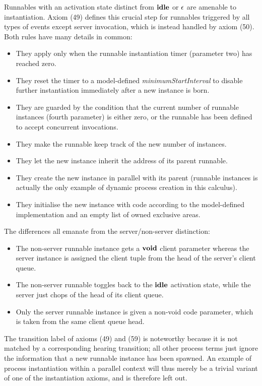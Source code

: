 \documentclass[twocolumn]{article}
\begin{document}
Runnables with an activation state distinct from $\textbf{idle}$ or $\epsilon$ are amenable to instantiation. Axiom (49) defines this crucial step for runnables triggered by all types of events except server invocation, which is instead handled by axiom (50). Both rules have many details in common:
\begin{itemize}
\item They apply only when the runnable instantiation timer (parameter two) has reached zero.
\item They reset the timer to a model-defined \emph{minimumStartInterval} to disable further instantiation immediately after a new instance is born.
\item They are guarded by the condition that the current number of runnable instances (fourth parameter) is either zero, or the runnable has been defined to accept concurrent invocations.
\item They make the runnable keep track of the new number of instances.
\item They let the new instance inherit the address of its parent runnable.
\item They create the new instance in parallel with its parent (runnable instances is actually the only example of dynamic process creation in this calculus).
\item They initialise the new instance with code according to the model-defined implementation and an empty list of owned exclusive areas.
\end{itemize}
The differences all emanate from the server/non-server distinction:
\begin{itemize}
\item The non-server runnable instance gets a $\textbf{void}$ client parameter whereas the server instance is assigned the client tuple from the head of the server's client queue.
\item The non-server runnable toggles back to the $\textbf{idle}$ activation state, while the server just chops of the head of its client queue.
\item Only the server runnable instance is given a non-void code parameter, which is taken from the same client queue head.
\end{itemize}
The transition label of axioms (49) and (59) is noteworthy because it is not matched by a corresponding hearing transition; all other process terms just ignore the information that a new runnable instance has been spawned. An example of process instantiation within a parallel context will thus merely be a trivial variant of one of the instantiation axioms, and is therefore left out.
\end{document}
